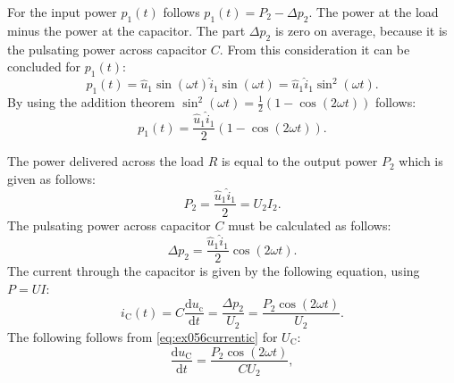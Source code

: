 \begin{solutionblock}
    For the input power $p_\mathrm{1}(t)$ follows $p_\mathrm{1}(t)= P_\mathrm{2} -\Delta p_\mathrm{2}$. The power at the load minus the power at the capacitor. The part $\Delta p_\mathrm{2}$ is zero on average, because it is the pulsating power across capacitor $C$. From this consideration it can be concluded for $p_\mathrm{1}(t)$:
    \begin{equation}
        p_\mathrm{1}(t) = \hat u_\mathrm{1} \sin(\omega t) \hat i_\mathrm{1} \sin(\omega t) = \hat u_\mathrm{1} \hat i_\mathrm{1} \sin^2(\omega t).
    \end{equation}
    By using the addition theorem $\sin^2(\omega t) = \frac{1}{2}(1-\cos(2\omega t))$ follows:
    \begin{equation}
        p_\mathrm{1}(t) = \frac{\hat u_\mathrm{1} \hat i_\mathrm{1}}{2}(1-\cos(2\omega t)).
    \end{equation}

    The power delivered across the load $R$ is equal to the output power $P_\mathrm{2}$ which is given as follows:
    \begin{equation}
        P_\mathrm{2} = \frac{\hat u_\mathrm{1}\hat i_\mathrm{1}}{2} = U_\mathrm{2} I_\mathrm{2}.
    \end{equation}
    The pulsating power across capacitor $C$ must be calculated as follows:
    \begin{equation}
        \Delta p_\mathrm{2} = \frac{\hat u_\mathrm{1}\hat i_\mathrm{1}}{2} \cos(2\omega t).
    \end{equation}
    The current through the capacitor is given by the following equation, using $P = UI$:
    \begin{equation}
        i_\mathrm{C}(t)=C \frac{\mathrm{d}u_\mathrm{c}}{\mathrm{d}t} = \frac{\Delta p_\mathrm{2}}{U_\mathrm{2}} = \frac{P_\mathrm{2}\cos(2\omega t)}{U_\mathrm{2}}.\label{eq:ex056currentic}
    \end{equation}
    The following follows from \eqref{eq:ex056currentic} for $U_\mathrm{C}$:
    \begin{equation}
        \frac{\mathrm{d}u_\mathrm{C}}{\mathrm{d}t} = \frac{P_\mathrm{2}\cos (2\omega t)}{C U_\mathrm{2}},
    \end{equation}


\end{solutionblock}
